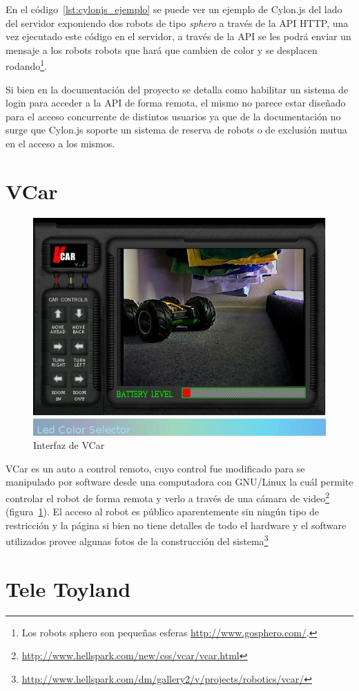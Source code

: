 En el código~\ref{lst:cylonjs_ejemplo} se puede ver un ejemplo de
Cylon.js del lado del servidor exponiendo dos robots de tipo
\textit{sphero} a través de la API HTTP,
una vez ejecutado este código en el servidor, a través de la API se
les podrá enviar un mensaje a los robots
robots que hará que cambien
de color
y se desplacen
rodando\footnote{Los robots sphero son pequeñas esferas \url{http://www.gosphero.com/}.}.

Si bien en la documentación del proyecto se detalla como habilitar
un sistema de login para acceder a la API de forma remota, el mismo
no parece estar diseñado para el acceso concurrente de distintos usuarios
ya que de la documentación no surge que Cylon.js soporte un sistema
de reserva de robots o de exclusión mutua en el acceso a los mismos.

\section{VCar}

\begin{figure}
    \centering
    \includegraphics[width=0.5\linewidth]{figures/vcar}
    \caption{Interfaz de VCar}
    \label{fig:vcar}
\end{figure}

VCar es un auto a control remoto, cuyo control fue modificado para
se manipulado por software desde  una computadora con GNU/Linux la
cuál permite controlar el robot de forma remota y verlo
a través de una cámara de
video\footnote{\url{http://www.hellspark.com/new/css/vcar/vcar.html}}
(figura~\ref{fig:vcar}).
El acceso al robot es público
aparentemente sin ningún tipo de restricción y la página
si bien no tiene detalles de todo el hardware y el software utilizados
provee algunas fotos de la construcción del
sistema\footnote{\url{http://www.hellspark.com/dm/gallery2/v/projects/robotics/vcar/}}


\section{Tele Toyland}

